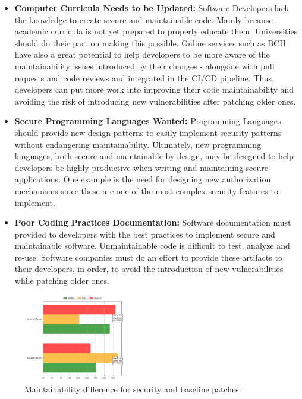 \documentclass[10pt,conference]{IEEEtran}
\begin{document}
\begin{itemize}

	\item\textbf{Computer Curricula Needs to be Updated:}
	Software Developers lack the knowledge to create secure and
	maintainable code. Mainly because academic curricula is not yet prepared
	to properly educate them. Universities should do their part on making
	this possible. Online services such as BCH have also a great potential to help
	developers to be more aware of the maintainability issues introduced by their
	changes - alongside with pull requests and code reviews and integrated in 
	the CI/CD pipeline. Thus, developers can 
	put more work into improving their code maintainability and avoiding the risk
	of introducing new vulnerabilities after patching older ones.
	
	\item\textbf{Secure Programming Languages Wanted:} Programming Languages 
	should provide new design patterns to easily implement security patterns 
	without endangering maintainability.
	Ultimately, new programming languages, both secure and maintainable by design,
	may be designed to help developers be highly productive when writing and
	maintaining secure applications. One example is the need for designing new
	authorization mechanisms since these are one of the most complex security
	features to implement.
	
	\item\textbf{Poor Coding Practices Documentation:} 
	Software documentation must provided to developers with the
	best practices to implement secure and maintainable software. Unmaintainable
	code is difficult to test, analyze and re-use. Software companies must
	do an effort to provide these artifacts to their developers, in order,
	to avoid the introduction of new vulnerabilities while patching older ones.
	
\end{itemize}

\begin{figure}[h]	
 	\centering 	\includegraphics[width=0.4\textwidth]{figures/main_comparison.pdf}
 	\caption{Maintainability difference for security and baseline patches.}
	\label{fig:secvsreg}
\end{figure}
\end{document}
